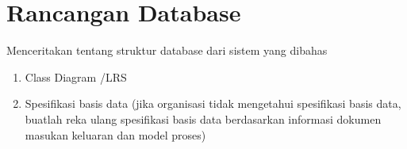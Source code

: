 \section{Rancangan Database}
\begin{sectioncontent}
    Menceritakan tentang struktur database dari sistem yang dibahas
    \begin{enumerate}[leftmargin=0.5cm]
        \item Class Diagram /LRS
        \item Spesifikasi basis data (jika organisasi tidak mengetahui spesifikasi basis data, buatlah reka ulang spesifikasi basis data berdasarkan informasi dokumen masukan keluaran dan model proses)
    \end{enumerate}
\end{sectioncontent}